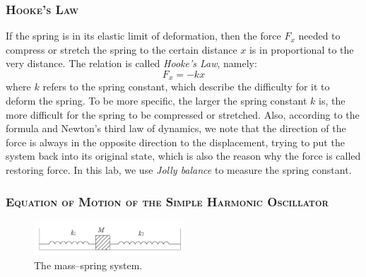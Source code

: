 \documentclass[a4paper,12pt]{article}
\begin{document}
\subsubsection{\textsc{Hooke’s Law}}
If the spring is in its elastic limit of deformation, then the force $F_x$ needed to compress or stretch the spring to the certain distance $x$ is in proportional to the very distance. The relation is called \textit{Hooke's Law}, namely:
\begin{equation}
F_x = -kx
\end{equation}
where $k$ refers to the spring constant, which describe the difficulty for it to deform the spring. To be more specific, the larger the spring constant $k$ is, the more difficult for the spring to be compressed or stretched. Also, according to the formula and Newton’s third law of dynamics, we note that the direction of the force is always in the opposite direction to the displacement, trying to put the system back into its original state, which is also the reason why the force is called restoring force. In this lab, we use \textit{Jolly balance} to measure the spring constant.
\subsubsection{\textsc{Equation of Motion of the Simple Harmonic Oscillator}}

\begin{figure}[h] 
    \centering
    \includegraphics[width=0.5\textwidth]{Fig1} 
    \caption{The mass–spring system. \cite{labmanual}} 
\end{figure}
\end{document}
